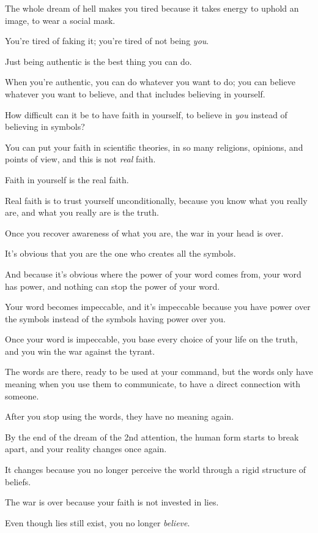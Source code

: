 \documentclass{article}
\numberwithin{equation}{section}
\begin{document}
The whole dream of hell makes you tired because it takes energy to uphold an image, to wear a social mask.

You're tired of faking it; you're tired of not being \textit{you}.

Just being authentic is the best thing you can do.

When you're authentic, you can do whatever you want to do; you can believe whatever you want to believe, and that includes believing in yourself.

%
How difficult can it be to have faith in yourself, to believe in \textit{you} instead of believing in symbols?

You can put your faith in scientific theories, in so many religions, opinions, and points of view, and this is not \textit{real} faith.

Faith in yourself is the real faith.

Real faith is to trust yourself unconditionally, because you know what you really are, and what you really are is the truth.

Once you recover awareness of what you are, the war in your head is over.

It's obvious that you are the one who creates all the symbols.

And because it's obvious where the power of your word comes from, your word has power, and nothing can stop the power of your word.

Your word becomes impeccable, and it's impeccable because you have power over the symbols instead of the symbols having power over you.

Once your word is impeccable, you base every choice of your life on the truth, and you win the war against the tyrant.

The words are there, ready to be used at your command, but the words only have meaning when you use them to communicate, to have a direct connection with someone.

After you stop using the words, they have no meaning again.

%
By the end of the dream of the 2nd attention, the human form starts to break apart, and your reality changes once again.

It changes because you no longer perceive the world through a rigid structure of beliefs.

The war is over because your faith is not invested in lies.

Even though lies still exist, you no longer \textit{believe}.
\end{document}
